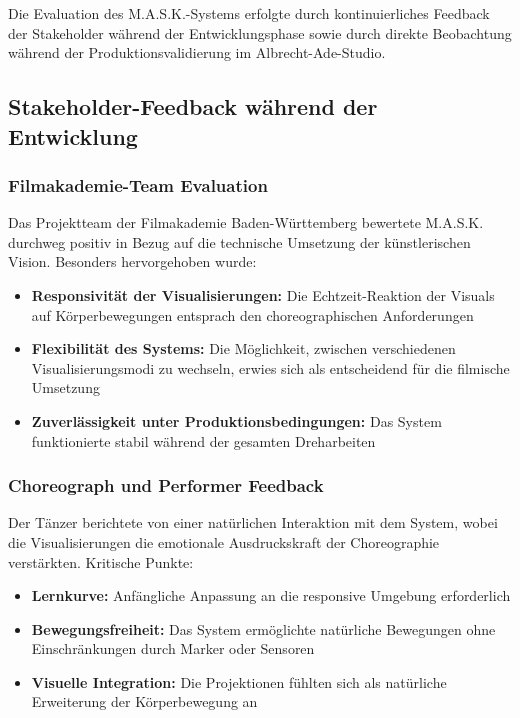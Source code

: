 Die Evaluation des M.A.S.K.-Systems erfolgte durch kontinuierliches Feedback der Stakeholder während der Entwicklungsphase sowie durch direkte Beobachtung während der Produktionsvalidierung im Albrecht-Ade-Studio.

\subsection{Stakeholder-Feedback während der Entwicklung}

\subsubsection{Filmakademie-Team Evaluation}
Das Projektteam der Filmakademie Baden-Württemberg bewertete M.A.S.K. durchweg positiv in Bezug auf die technische Umsetzung der künstlerischen Vision. Besonders hervorgehoben wurde:

\begin{itemize}
    \item \textbf{Responsivität der Visualisierungen:} Die Echtzeit-Reaktion der Visuals auf Körperbewegungen entsprach den choreographischen Anforderungen
    \item \textbf{Flexibilität des Systems:} Die Möglichkeit, zwischen verschiedenen Visualisierungsmodi zu wechseln, erwies sich als entscheidend für die filmische Umsetzung
    \item \textbf{Zuverlässigkeit unter Produktionsbedingungen:} Das System funktionierte stabil während der gesamten Dreharbeiten
\end{itemize}

\subsubsection{Choreograph und Performer Feedback}
Der Tänzer berichtete von einer natürlichen Interaktion mit dem System, wobei die Visualisierungen die emotionale Ausdruckskraft der Choreographie verstärkten. Kritische Punkte:

\begin{itemize}
    \item \textbf{Lernkurve:} Anfängliche Anpassung an die responsive Umgebung erforderlich
    \item \textbf{Bewegungsfreiheit:} Das System ermöglichte natürliche Bewegungen ohne Einschränkungen durch Marker oder Sensoren
    \item \textbf{Visuelle Integration:} Die Projektionen fühlten sich als natürliche Erweiterung der Körperbewegung an
\end{itemize}

